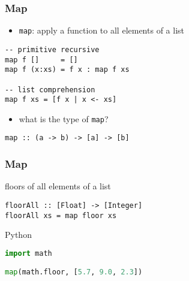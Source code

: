 \documentclass[dvipsnames]{beamer}
\theoremstyle{plain}
\begin{document}
\begin{frame}[fragile]
  \frametitle{Map}

  \begin{itemize}
    \item \lstinline{map}: apply a function to all elements of a list
  \end{itemize}

  \begin{exampleblock}{}
    \begin{lstlisting}
-- primitive recursive
map f []     = []
map f (x:xs) = f x : map f xs

-- list comprehension
map f xs = [f x | x <- xs]
    \end{lstlisting}
  \end{exampleblock}

  \pause
  \begin{itemize}
    \item what is the type of \lstinline{map}?
  \end{itemize}

  \begin{lstlisting}
map :: (a -> b) -> [a] -> [b]
  \end{lstlisting}
\end{frame}

\begin{frame}[fragile]
  \frametitle{Map}

  \begin{exampleblock}{floors of all elements of a list}
    \begin{lstlisting}
floorAll :: [Float] -> [Integer]
floorAll xs = map floor xs
    \end{lstlisting}
  \end{exampleblock}

  \bigskip
  \begin{exampleblock}{Python}
    \begin{lstlisting}[language=python]
import math

map(math.floor, [5.7, 9.0, 2.3])
    \end{lstlisting}
  \end{exampleblock}
\end{frame}
\end{document}
